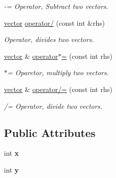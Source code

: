 \begin{DoxyCompactItemize}
\begin{DoxyCompactList}\small\item\em -\/= Operator, Subtract two vectors. \end{DoxyCompactList}\item 
\hyperlink{classvector}{vector} \hyperlink{classvector_ae0836088e84b7488c6b9d5f035e0f445}{operator/} (const int \&rhs)\hypertarget{classvector_ae0836088e84b7488c6b9d5f035e0f445}{}\label{classvector_ae0836088e84b7488c6b9d5f035e0f445}

\begin{DoxyCompactList}\small\item\em Operator, divides two vectors. \end{DoxyCompactList}\item 
\hyperlink{classvector}{vector} \& \hyperlink{classvector_ad1d720c7cd340d051ff39a31f95995f7}{operator$\ast$=} (const int rhs)\hypertarget{classvector_ad1d720c7cd340d051ff39a31f95995f7}{}\label{classvector_ad1d720c7cd340d051ff39a31f95995f7}

\begin{DoxyCompactList}\small\item\em $\ast$= Oparetor, multiply two vectors. \end{DoxyCompactList}\item 
\hyperlink{classvector}{vector} \& \hyperlink{classvector_ac4edbda57c9dadf74cd45c1c073b1e62}{operator/=} (const int rhs)\hypertarget{classvector_ac4edbda57c9dadf74cd45c1c073b1e62}{}\label{classvector_ac4edbda57c9dadf74cd45c1c073b1e62}

\begin{DoxyCompactList}\small\item\em /= Operator, divide two vectors. \end{DoxyCompactList}\end{DoxyCompactItemize}
\subsection*{Public Attributes}
\begin{DoxyCompactItemize}
\item 
int {\bfseries x}\hypertarget{classvector_a0403eb3aea23a3009e276fba1d317046}{}\label{classvector_a0403eb3aea23a3009e276fba1d317046}

\item 
int {\bfseries y}\hypertarget{classvector_aad6de640298eae97ca0a094db5aff477}{}\label{classvector_aad6de640298eae97ca0a094db5aff477}

\end{DoxyCompactItemize}


